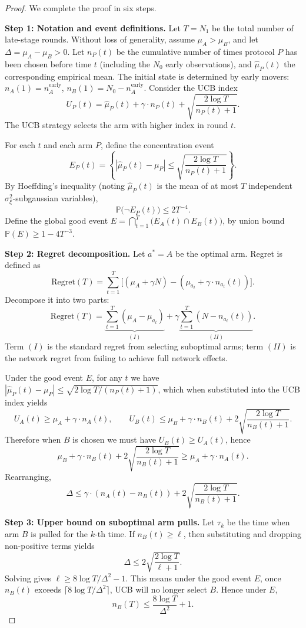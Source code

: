 \documentclass[12pt,a4paper]{article}
\newcommand{\Regret}{\mathrm{Regret}}
\begin{document}
\begin{proof}
We complete the proof in six steps.

\textbf{Step 1: Notation and event definitions.}
Let $T = N_1$ be the total number of late-stage rounds. Without loss of generality, assume $\mu_A > \mu_B$, and let $\Delta = \mu_A - \mu_B > 0$.
Let $n_P(t)$ be the cumulative number of times protocol $P$ has been chosen before time $t$ (including the $N_0$ early observations), and $\hat{\mu}_P(t)$ the corresponding empirical mean. The initial state is determined by early movers:
$n_A(1) = n_A^{\text{early}}$, $n_B(1) = N_0 - n_A^{\text{early}}$.
Consider the UCB index
\[
U_P(t) = \hat{\mu}_P(t) + \gamma\cdot n_P(t) + \sqrt{\frac{2\log T}{n_P(t)+1}}.
\]
The UCB strategy selects the arm with higher index in round $t$.

For each $t$ and each arm $P$, define the concentration event
\[
E_P(t) = \left\{ |\hat{\mu}_P(t) - \mu_P| \leq \sqrt{\frac{2\log T}{n_P(t)+1}} \right\}.
\]
By Hoeffding's inequality (noting $\hat{\mu}_P(t)$ is the mean of at most $T$ independent $\sigma_\xi^2$-subgaussian variables),
\[
\mathbb{P}\big(\neg E_P(t)\big) \leq 2T^{-4}.
\]
Define the global good event $E = \bigcap_{t=1}^{T} \big(E_A(t) \cap E_B(t)\big)$,
by union bound $\mathbb{P}(E) \geq 1 - 4T^{-3}$.

\textbf{Step 2: Regret decomposition.}
Let $a^* = A$ be the optimal arm. Regret is defined as
\[
\Regret(T) = \sum_{t=1}^{T} \big[ (\mu_A + \gamma N) - (\mu_{a_t} + \gamma\cdot n_{a_t}(t)) \big].
\]
Decompose it into two parts:
\[
\Regret(T) = \underbrace{\sum_{t=1}^{T} (\mu_A - \mu_{a_t})}_{(I)}
          + \gamma\underbrace{\sum_{t=1}^{T} (N - n_{a_t}(t))}_{(II)}.
\]
Term $(I)$ is the standard regret from selecting suboptimal arms; term $(II)$ is the network regret from failing to achieve full network effects.

Under the good event $E$, for any $t$ we have $|\hat{\mu}_P(t) - \mu_P| \leq \sqrt{2\log T/(n_P(t)+1)}$, which when substituted into the UCB index yields
\[
U_A(t) \geq \mu_A + \gamma\cdot n_A(t),\qquad
U_B(t) \leq \mu_B + \gamma\cdot n_B(t) + 2\sqrt{\frac{2\log T}{n_B(t)+1}}.
\]
Therefore when $B$ is chosen we must have $U_B(t) \geq U_A(t)$, hence
\[
\mu_B + \gamma\cdot n_B(t) + 2\sqrt{\frac{2\log T}{n_B(t)+1}} \geq \mu_A + \gamma\cdot n_A(t).
\]
Rearranging,
\[
\Delta \leq \gamma\cdot (n_A(t) - n_B(t)) + 2\sqrt{\frac{2\log T}{n_B(t)+1}}.
\]

\textbf{Step 3: Upper bound on suboptimal arm pulls.}
Let $\tau_k$ be the time when arm $B$ is pulled for the $k$-th time. If $n_B(t) \geq \ell$, then substituting and dropping non-positive terms yields
\[
\Delta \leq 2\sqrt{\frac{2\log T}{\ell+1}}.
\]
Solving gives $\ell \geq 8\log T/\Delta^2 - 1$. This means under the good event $E$, once $n_B(t)$ exceeds $\lceil 8\log T/\Delta^2 \rceil$, UCB will no longer select $B$. Hence under $E$,
\[
n_B(T) \leq \frac{8\log T}{\Delta^2} + 1.
\]


\end{proof}
\end{document}
